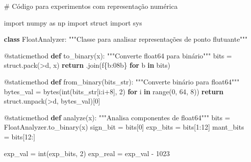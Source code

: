 \documentclass[
  11pt,
  letterpaper,
  DIV=11,
  numbers=noendperiod]{scrartcl}
\newenvironment{Shaded}{\begin{snugshade}}{\end{snugshade}}
\newcommand{\AttributeTok}[1]{\textcolor[rgb]{0.40,0.45,0.13}{#1}}
\newcommand{\BuiltInTok}[1]{\textcolor[rgb]{0.00,0.23,0.31}{#1}}
\newcommand{\CommentTok}[1]{\textcolor[rgb]{0.37,0.37,0.37}{#1}}
\newcommand{\ControlFlowTok}[1]{\textcolor[rgb]{0.00,0.23,0.31}{\textbf{#1}}}
\newcommand{\DecValTok}[1]{\textcolor[rgb]{0.68,0.00,0.00}{#1}}
\newcommand{\ImportTok}[1]{\textcolor[rgb]{0.00,0.46,0.62}{#1}}
\newcommand{\KeywordTok}[1]{\textcolor[rgb]{0.00,0.23,0.31}{\textbf{#1}}}
\newcommand{\NormalTok}[1]{\textcolor[rgb]{0.00,0.23,0.31}{#1}}
\newcommand{\OperatorTok}[1]{\textcolor[rgb]{0.37,0.37,0.37}{#1}}
\newcommand{\SpecialCharTok}[1]{\textcolor[rgb]{0.37,0.37,0.37}{#1}}
\newcommand{\SpecialStringTok}[1]{\textcolor[rgb]{0.13,0.47,0.30}{#1}}
\newcommand{\StringTok}[1]{\textcolor[rgb]{0.13,0.47,0.30}{#1}}
\begin{document}
\begin{Shaded}
\begin{Highlighting}[]
\CommentTok{\# Código para experimentos com representação numérica}

\ImportTok{import}\NormalTok{ numpy }\ImportTok{as}\NormalTok{ np}
\ImportTok{import}\NormalTok{ struct}
\ImportTok{import}\NormalTok{ sys}

\KeywordTok{class}\NormalTok{ FloatAnalyzer:}
    \CommentTok{"""Classe para analisar representações de ponto flutuante"""}
    
    \AttributeTok{@staticmethod}
    \KeywordTok{def}\NormalTok{ to\_binary(x):}
        \CommentTok{"""Converte float64 para binário"""}
\NormalTok{        bits }\OperatorTok{=}\NormalTok{ struct.pack(}\StringTok{\textquotesingle{}\textgreater{}d\textquotesingle{}}\NormalTok{, x)}
        \ControlFlowTok{return} \StringTok{\textquotesingle{}\textquotesingle{}}\NormalTok{.join(}\SpecialStringTok{f\textquotesingle{}}\SpecialCharTok{\{}\NormalTok{b}\SpecialCharTok{:08b\}}\SpecialStringTok{\textquotesingle{}} \ControlFlowTok{for}\NormalTok{ b }\KeywordTok{in}\NormalTok{ bits)}
    
    \AttributeTok{@staticmethod}
    \KeywordTok{def}\NormalTok{ from\_binary(bits\_str):}
        \CommentTok{"""Converte binário para float64"""}
\NormalTok{        bytes\_val }\OperatorTok{=} \BuiltInTok{bytes}\NormalTok{(}\BuiltInTok{int}\NormalTok{(bits\_str[i:i}\OperatorTok{+}\DecValTok{8}\NormalTok{], }\DecValTok{2}\NormalTok{) }
                         \ControlFlowTok{for}\NormalTok{ i }\KeywordTok{in} \BuiltInTok{range}\NormalTok{(}\DecValTok{0}\NormalTok{, }\DecValTok{64}\NormalTok{, }\DecValTok{8}\NormalTok{))}
        \ControlFlowTok{return}\NormalTok{ struct.unpack(}\StringTok{\textquotesingle{}\textgreater{}d\textquotesingle{}}\NormalTok{, bytes\_val)[}\DecValTok{0}\NormalTok{]}
    
    \AttributeTok{@staticmethod}
    \KeywordTok{def}\NormalTok{ analyze(x):}
        \CommentTok{"""Analisa componentes de float64"""}
\NormalTok{        bits }\OperatorTok{=}\NormalTok{ FloatAnalyzer.to\_binary(x)}
\NormalTok{        sign\_bit }\OperatorTok{=}\NormalTok{ bits[}\DecValTok{0}\NormalTok{]}
\NormalTok{        exp\_bits }\OperatorTok{=}\NormalTok{ bits[}\DecValTok{1}\NormalTok{:}\DecValTok{12}\NormalTok{]}
\NormalTok{        mant\_bits }\OperatorTok{=}\NormalTok{ bits[}\DecValTok{12}\NormalTok{:]}
        
\NormalTok{        exp\_val }\OperatorTok{=} \BuiltInTok{int}\NormalTok{(exp\_bits, }\DecValTok{2}\NormalTok{)}
\NormalTok{        exp\_real }\OperatorTok{=}\NormalTok{ exp\_val }\OperatorTok{{-}} \DecValTok{1023}
        

\end{Highlighting}
\end{Shaded}
\end{document}
